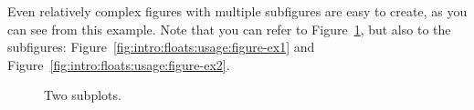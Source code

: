 


Even relatively complex figures with multiple subfigures are easy to create, as you can see from this example. Note that you can refer to Figure~\ref{fig:intro:floats:usage:figure}, but also to the subfigures: Figure~\ref{fig:intro:floats:usage:figure-ex1} and Figure~\ref{fig:intro:floats:usage:figure-ex2}.
\begin{figure}
  \centering
   \hfill
  \caption{Two subplots.}
  \label{fig:intro:floats:usage:figure}
\end{figure}

